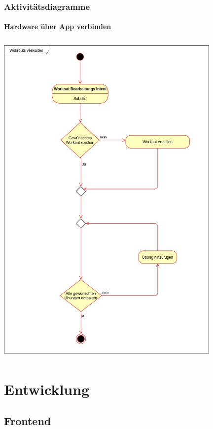 \documentclass[12pt]{article}
\theoremstyle{definition}
\begin{document}
\pagebreak
\subsubsection{Aktivitätsdiagramme}
\paragraph{Hardware über App verbinden}
\begin{center}

\includegraphics[width=11cm, height=17cm]{Aktivitaetsdiagramm.jpg}

\end{center}

\pagebreak
\section{Entwicklung}

\subsection{Frontend}
\end{document}
